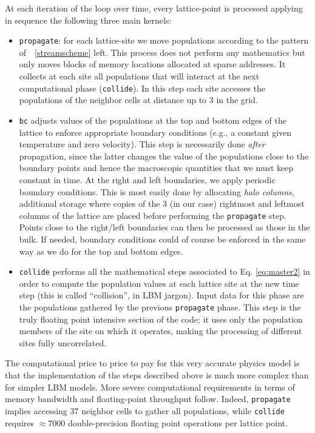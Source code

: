 \documentclass{elsarticle}
\newcommand{\bi}{\begin{itemize}}
\newcommand{\ei}{\end{itemize}}
\begin{document}
At each iteration of the loop over time, every lattice-point is processed 
applying in sequence the following three main kernels:
%
\bi
%
\item {\tt propagate}: for each lattice-site we move populations according to
       the pattern of~\figurename~\ref{streamscheme} left. This process does not
       perform any mathematics but only  moves blocks of memory
       locations allocated at sparse addresses.  It collects at each site all
       populations that will interact at the next  computational phase
       ({\tt collide}). In this step each site accesses the
       populations of the neighbor cells at distance up to 3 in the 
       grid. 
%
\item {\tt bc} adjusts values of the populations at the top and bottom edges of
      the lattice to enforce appropriate boundary conditions (e.g., a constant
      given temperature and zero velocity). This step is necessarily done {\em
      after} propagation, since the latter changes the value of the populations
      close to the boundary points and hence the
      macroscopic quantities that we must keep constant in time.  At the right
      and left boundaries, we apply periodic boundary conditions.  This is most
      easily done by allocating {\em halo columns}, additional  storage where
      copies of the 3 (in our case) rightmost and leftmost columns of the
      lattice are placed before performing the {\tt propagate} step. Points 
      close to the right/left boundaries can then be processed as those in the
      bulk.  If needed, boundary conditions could of course be enforced in the
      same way as we do for the top and bottom edges. 
%
\item {\tt collide} performs all the mathematical steps associated
      to Eq. \ref{eq:master2} in order to compute the population
      values at each lattice site at the new time step
      (this is called ``collision'', in LBM jargon). Input data for this phase 
      are the populations gathered by the previous {\tt propagate} phase. This 
      step is the truly floating point intensive section of the code; it uses 
      only the population members of the site on which it operates, making the 
      processing of different sites fully uncorrelated.    
%
\ei

The computational price to
price to pay for this very accurate physics model is that the implementation  of
the steps described above is much more complex than for simpler LBM models. 
%
More severe computational requirements in terms of memory bandwidth and
floating-point throughput follow. Indeed, {\tt propagate} implies accessing 37 
neighbor cells to gather all populations, while {\tt collide} requires 
$\approx 7000$ double-precision  floating point operations per lattice point.
\end{document}
